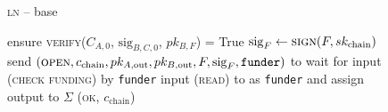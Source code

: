 \begin{figure}[H]
\begin{processbox}{\textsc{ln} -- base}
\begin{algorithmic}[1]
          \State {}
          \State {}
          \State {}
          \State {}
          \State {}
          \State ensure \textsc{verify}($C_{A, 0}$, $\mathrm{sig}_{B, C, 0}$,
          $pk_{B, F}$) = True
        \EndIf
        \State $\mathrm{sig}_F \gets \textsc{sign}(F, sk_{\mathrm{chain}})$
        \label{code:ln:base:sign-funding}
        \State send $(\textsc{open}, c_{\mathrm{chain}}, pk_{A, \mathrm{out}},
        pk_{B, \mathrm{out}}, F, \mathrm{sig}_F, \texttt{funder})$ to \adversary
          \State wait for input (\textsc{check funding}) by \texttt{funder}
          \State input (\textsc{read}) to \ledger as \texttt{funder} and assign
          output to $\Sigma$
        \EndWhile
        \State \Return (\textsc{ok}, $c_{\mathrm{chain}}$)
      \EndIndent
    \end{algorithmic}
  \end{processbox}
  \caption{}
  \label{code:ln:base}
\end{figure}

